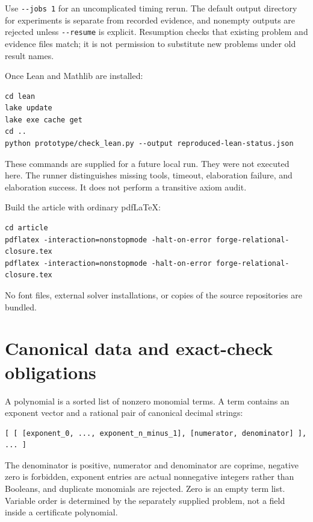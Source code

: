 \documentclass[11pt,letterpaper]{article}
\theoremstyle{definition}
\newcommand{\code}[1]{\nolinkurl{#1}}
\begin{document}
Use \code{--jobs 1} for an uncomplicated timing rerun. The default output
directory for experiments is separate from recorded evidence, and nonempty
outputs are rejected unless \code{--resume} is explicit. Resumption checks that
existing problem and evidence files match; it is not permission to substitute
new problems under old result names.

Once Lean and Mathlib are installed:
\begin{lstlisting}
cd lean
lake update
lake exe cache get
cd ..
python prototype/check_lean.py --output reproduced-lean-status.json
\end{lstlisting}
These commands are supplied for a future local run. They were not executed here.
The runner distinguishes missing tools, timeout, elaboration failure, and
elaboration success. It does not perform a transitive axiom audit.

Build the article with ordinary pdfLaTeX:
\begin{lstlisting}
cd article
pdflatex -interaction=nonstopmode -halt-on-error forge-relational-closure.tex
pdflatex -interaction=nonstopmode -halt-on-error forge-relational-closure.tex
\end{lstlisting}
No font files, external solver installations, or copies of the source repositories
are bundled.

\section{Canonical data and exact-check obligations}
\label{app:schema}

A polynomial is a sorted list of nonzero monomial terms. A term contains an
exponent vector and a rational pair of canonical decimal strings:
\begin{lstlisting}
[ [ [exponent_0, ..., exponent_n_minus_1], [numerator, denominator] ], ... ]
\end{lstlisting}
The denominator is positive, numerator and denominator are coprime, negative
zero is forbidden, exponent entries are actual nonnegative integers rather
than Booleans, and duplicate monomials are rejected. Zero is an empty term list.
Variable order is determined by the separately supplied problem, not a field
inside a certificate polynomial.
\end{document}
